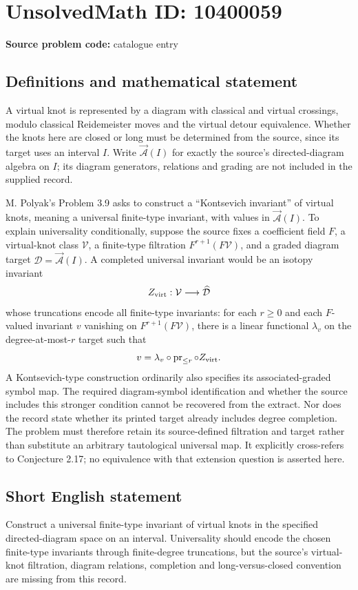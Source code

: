 \documentclass[11pt]{article}
\begin{document}
\section*{UnsolvedMath ID: 10400059}
\textbf{Source problem code:} catalogue entry
\subsection{Definitions and mathematical statement}
A virtual knot is represented by a diagram with classical and virtual crossings, modulo classical Reidemeister moves and the virtual detour equivalence. Whether the knots here are closed or long must be determined from the source, since its target uses an interval \(I\). Write \(\overrightarrow{\mathcal A}(I)\) for exactly the source's directed-diagram algebra on \(I\); its diagram generators, relations and grading are not included in the supplied record.

M. Polyak's Problem 3.9 asks to construct a ``Kontsevich invariant'' of virtual knots, meaning a universal finite-type invariant, with values in \(\overrightarrow{\mathcal A}(I)\). To explain universality conditionally, suppose the source fixes a coefficient field \(F\), a virtual-knot class \(\mathcal V\), a finite-type filtration \(F^{r+1}(F\mathcal V)\), and a graded diagram target \(\mathcal D=\overrightarrow{\mathcal A}(I)\). A completed universal invariant would be an isotopy invariant
\[
 Z_{\rm virt}:\mathcal V\longrightarrow\widehat{\mathcal D}
\]
whose truncations encode all finite-type invariants: for each \(r\ge0\) and each \(F\)-valued invariant \(v\) vanishing on \(F^{r+1}(F\mathcal V)\), there is a linear functional \(\lambda_v\) on the degree-at-most-\(r\) target such that
\[
 v=\lambda_v\circ\operatorname{pr}_{\le r}\circ Z_{\rm virt}.
\]
A Kontsevich-type construction ordinarily also specifies its associated-graded symbol map. The required diagram-symbol identification and whether the source includes this stronger condition cannot be recovered from the extract. Nor does the record state whether its printed target already includes degree completion. The problem must therefore retain its source-defined filtration and target rather than substitute an arbitrary tautological universal map. It explicitly cross-refers to Conjecture 2.17; no equivalence with that extension question is asserted here.
\subsection{Short English statement}
Construct a universal finite-type invariant of virtual knots in the specified directed-diagram space on an interval. Universality should encode the chosen finite-type invariants through finite-degree truncations, but the source's virtual-knot filtration, diagram relations, completion and long-versus-closed convention are missing from this record.
\end{document}
